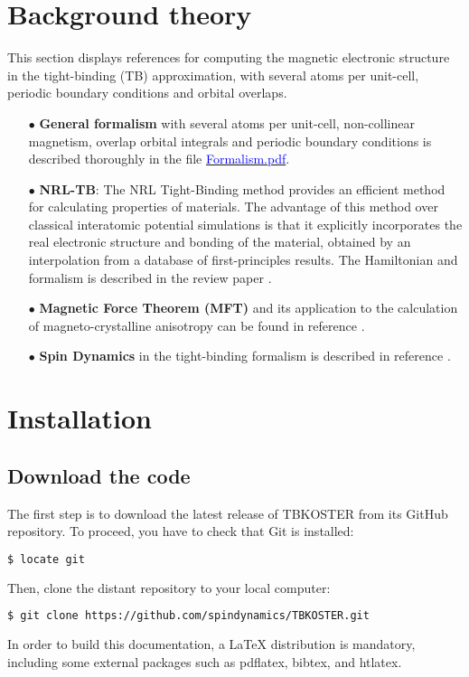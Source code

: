 \documentclass[12pt, onecolumn]{memoir}
\begin{document}
\mainmatter

\chapter{Background theory}

This section displays references for computing the magnetic electronic structure in the tight-binding (TB) approximation, with several atoms per unit-cell, periodic boundary conditions and orbital overlaps.

\begin{itemize}
  \item[$\bullet$]{\textbf{General formalism} with several atoms per unit-cell, non-collinear magnetism, overlap orbital integrals and periodic boundary conditions is described thoroughly in the file \href{https://fr.overleaf.com/read/hvmmbjspmtcg#e8c298}{\textcolor{blue}{Formalism.pdf}}.}
  \item[$\bullet$]{\textbf{NRL-TB}: The NRL Tight-Binding method provides an efficient method for calculating properties of materials. The advantage of this method over classical interatomic potential simulations is that it explicitly incorporates the real electronic structure and bonding of the material, obtained by an interpolation from a database of first-principles results. The Hamiltonian and formalism is described in the review paper \cite{barreteauEfficientMagneticTightbinding2016}.} 
  \item[$\bullet$]{\textbf{Magnetic Force Theorem (MFT)} and its application to the calculation of magneto-crystalline anisotropy can be found in reference \cite{liMagnetocrystallineAnisotropyEnergy2013}.
  }
  \item[$\bullet$]{\textbf{Spin Dynamics} in the tight-binding formalism is described in reference \cite{cardiasSpinDynamicsConstrained2021}.
  } 
\end{itemize}
\vfil

\chapter{Installation}

\section{Download the code}

The first step is to download the latest release of TBKOSTER from its GitHub repository. To proceed, you have to check that Git is installed:
\begin{lstlisting}[language=bash,basicstyle=\small\ttfamily]
$ locate git
\end{lstlisting}
Then, clone the distant repository to your local computer:
\begin{lstlisting}[language=bash,basicstyle=\small\ttfamily]
$ git clone https://github.com/spindynamics/TBKOSTER.git
\end{lstlisting}
In order to build this documentation, a LaTeX distribution is mandatory, including some external packages such as pdflatex, bibtex, and htlatex.
\end{document}
